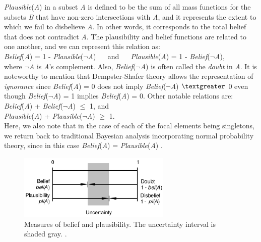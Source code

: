 \documentclass[11pt]{article}
\begin{document}
\noindent \textit{Plausible}(\textit{A}) in a subset \textit{A} is defined to
be the sum of all mass functions for the subsets \textit{B} that have non-zero
intersections with \textit{A}, and it represents the extent to which we fail to
disbelieve \textit{A}. In other words, it corresponds to the total belief that
does not contradict \textit{A}. The plausibility and belief functions are
related to one another, and we can represent this relation as:\\

\noindent\textit{Belief}(\textit{A}) = 1 -
\textit{Plausible}(\textit{$\neg$A}) $\quad$ and $\quad$
\textit{Plausible}(\textit{A}) = 1 - \textit{Belief}(\textit{$\neg$A}),\\

\noindent where \textit{$\neg$A} is \textit{A}'s complement. Also,
\textit{Belief}(\textit{$\neg$A}) is often called the \textit{doubt} in
\textit{A}. It is noteworthy to mention that Dempster-Shafer theory allows the
representation of \textit{ignorance} since \textit{Belief}(\textit{A}) = 0 does
not imply \textit{Belief}(\textit{$\neg$A}) $\textgreater$ 0 even though
\textit{Belief}(\textit{$\neg$A}) = 1 implies \textit{Belief}(\textit{A}) = 0. Other
notable relations are:\\

\noindent\textit{Belief}(\textit{A}) + \textit{Belief}(\textit{$\neg$A}) $\leq$ 1,
and\\

\noindent\textit{Plausible}(\textit{A}) +
\textit{Plausible}(\textit{$\neg$A}) $\geq$ 1.\\

Here, we also note that in the case of each of the focal elements being
singletons, we return back to traditional Bayesian analysis incorporating
normal probability theory, since in this case \textit{Belief}(\textit{A}) =
\textit{Plausible}(\textit{A}) \cite{beynon:dst-alternative-decision}.

\begin{figure}[tbh]
  \center
  \includegraphics[width=0.65\textwidth]{figure/uncertainty.png}
  \caption{Measures of belief and plausibility. The uncertainty interval is
  shaded gray. \cite{kay:dst-reliability}.}
  \label{fig:uncertainty}
\end{figure}
\end{document}
